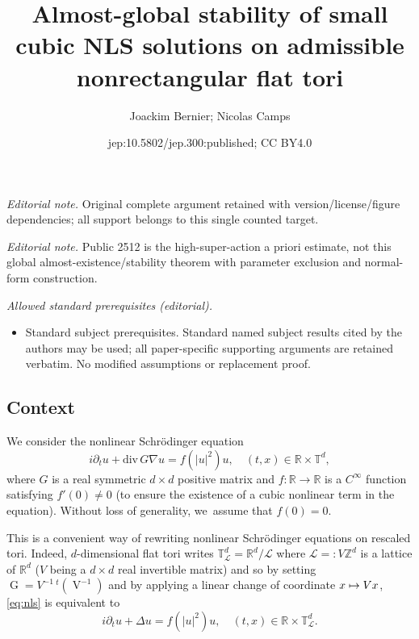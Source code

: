 \documentclass[10pt,a4paper]{amsart}
\title{Almost-global stability of small cubic NLS solutions on admissible nonrectangular flat tori}
\author{Joackim Bernier; Nicolas Camps}
\date{jep:10.5802/jep.300:published; CC BY4.0}
\newcommand\mto{\mathchoice{\longmapsto}{\mapsto}{\mapsto}{\mapsto}}
\theoremstyle{plain}
\theoremstyle{definition}
\newcommand{\R}{\mathbb{R}}
\newcommand{\T}{\mathbb{T}}
\newcommand{\1}{\mathbf{1}}
\begin{document}
\maketitle
\noindent\textit{Editorial note.} Original complete argument retained with version/license/figure dependencies; all support belongs to this single counted target.\par\medskip
\noindent\textit{Editorial note.} Public 2512 is the high-super-action a priori estimate, not this global almost-existence/stability theorem with parameter exclusion and normal-form construction.\par\medskip
\noindent\textit{Allowed standard prerequisites (editorial).}\begin{itemize}
\item Standard subject prerequisites. Standard named subject results cited by the authors may be used; all paper-specific supporting arguments are retained verbatim. No modified assumptions or replacement proof.
\end{itemize}\medskip
\subsection{Context}
We consider the nonlinear Schrödinger equation
\begin{equation}
\label{eq:nls}
\tag{NLS}
i\partial_{t}u + \mathrm{div} \, G \nabla u = f(|u|^{2})u,\quad (t,x)\in\R\times\mathbb{T}^{d},
\end{equation}
where $G$ is a real symmetric $d\times d$ positive matrix and $f:\R\to\R$ is a $C^\infty$ function satisfying $f'(0)\neq 0$ (to ensure the existence of a cubic nonlinear term in the equation). Without loss of generality, we~assume that $f(0)=0$.

This is a convenient way of rewriting nonlinear Schrödinger equations on rescaled tori. Indeed, $d$-dimensional flat tori writes $\mathbb{T}_{\mathscr{L}}^d= \R^d/\mathscr{L}$ where $\mathscr{L}=: V \mathbb{Z}^d$ is a lattice of $\R^d$ ($V$ being a $d\times d$ real invertible matrix) and so by setting $\operatorname{G} = V^{-1} \, ^{t}(\operatorname{V}^{-1})$ and by applying a linear change of coordinate $x\mto Vx$, \eqref{eq:nls} is equivalent to
\begin{equation*}
i\partial_tu + \Delta u = f(|u|^2)u,\quad (t,x)\in \R\times\T_{\mathscr{L}}^d.
\end{equation*}
\end{document}
